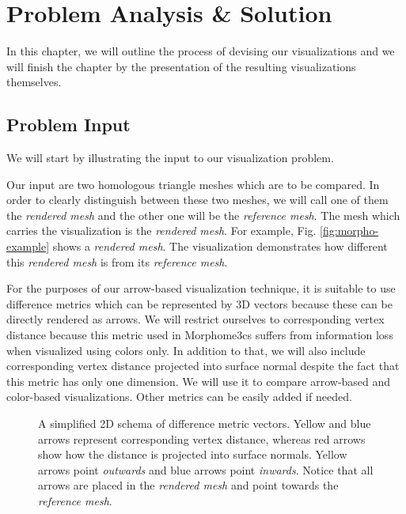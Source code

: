 \chapter{Problem Analysis \& Solution}
\label{chap:analysis}

In this chapter, we will outline the process of devising our visualizations and we will finish the chapter by the presentation of the resulting visualizations themselves.

\section{Problem Input}
\label{sec:analysis-input}

We will start by illustrating the input to our visualization problem.

Our input are two homologous triangle meshes which are to be compared. In order to clearly distinguish between these two meshes, we will call one of them the {\it rendered mesh} and the other one will be the {\it reference mesh}. The mesh which carries the visualization is the {\it rendered mesh}. For example, Fig. \ref{fig:morpho-example} shows a {\it rendered mesh}. The visualization demonstrates how different this {\it rendered mesh} is from its {\it reference mesh}.

For the purposes of our arrow-based visualization technique, it is suitable to use difference metrics which can be represented by 3D vectors because these can be directly rendered as arrows. We will restrict ourselves to corresponding vertex distance because this metric used in Morphome3cs suffers from information loss when visualized using colors only. In addition to that, we will also include corresponding vertex distance projected into surface normal despite the fact that this metric has only one dimension. We will use it to compare arrow-based and color-based visualizations. Other metrics can be easily added if needed.

\begin{figure}[h]
	\centering
	\def\svgwidth{\textwidth}
	
	\caption[Input Illustration]{A simplified 2D schema of difference metric vectors. Yellow and blue arrows represent corresponding vertex distance, whereas red arrows show how the distance is projected into surface normals. Yellow arrows point {\it outwards} and blue arrows point {\it inwards}. Notice that all arrows are placed in the {\it rendered mesh} and point towards the {\it reference mesh}.}
	\label{fig:illustration-problem_input}
\end{figure}

